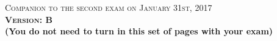 \documentclass{docist}
\begin{document}
\thispagestyle{empty}

\begin{center}
  {\Large \textsc{Companion to the second exam on January 31st, 2017\\[2ex]
  \textbf{Version: B}\\[2ex]}}
  {\normalsize  \textbf{(You do not need to turn in this set of pages with your exam)}}
\end{center}







\qModifiabilityScenario



\qAspectsTactics



\qHadoopStakeholdersEurosINGLES



\qHadoopHeartbeatINGLES





\qSoftwareArchitectureTwo



\qConcreteScenarios



\qAvailabilityScenarioTwo



\qAvailabilityINGLES



\qInfinispanThree



\qPerfomanceTacticTwo



\qTresTiersINGLES



\qSOAInteroperability



\qInstallView



\qTwitterTwo



\qTwitterFour
\end{document}
